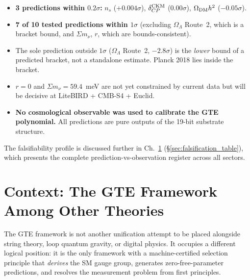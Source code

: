\documentclass[11pt,openany]{book}
\theoremstyle{remark}
\newcommand{\OmL}{\Omega_\Lambda}
\newcommand{\ns}{n_s}
\begin{document}
\begin{tcolorbox}[colback=blue!5,colframe=blue!50!black,
  title={Cosmological Summary: Zero Free Parameters}]
\begin{itemize}
\item \textbf{3 predictions within $0.2\sigma$:}
  $\ns$ ($+0.004\sigma$), $\delta_{CP}^{\rm CKM}$ ($0.00\sigma$),
  $\Omega_{\rm DM}h^2$ ($-0.05\sigma$).
\item \textbf{7 of 10 tested predictions within $1\sigma$}
  (excluding $\OmL$ Route~2, which is a bracket bound, and $\Sigma m_\nu$,
  $r$, which are bounds-consistent).
\item The sole prediction outside $1\sigma$ ($\OmL$ Route~2, $-2.8\sigma$)
  is the \emph{lower} bound of a predicted bracket, not a standalone estimate.
  Planck 2018 lies inside the bracket.
\item $r = 0$ and $\Sigma m_\nu = 59.4$~meV are not yet constrained by current
  data but will be decisive at LiteBIRD + CMB-S4 + Euclid.
\item \textbf{No cosmological observable was used to calibrate the GTE polynomial.}
  All predictions are pure outputs of the 19-bit substrate structure.
\end{itemize}
\end{tcolorbox}

The falsifiability profile is discussed further in Ch.~\ref{chap:context}
(§\ref{sec:falsification_table}), which presents the complete prediction-vs-observation
register across all sectors.

\chapter[Context: GTE Among Other Theories]{Context: The GTE Framework Among Other Theories}
\label{chap:context}

\begin{tcolorbox}[colback=blue!5,colframe=blue!50!black,title={Chapter~11 Claim}]
The GTE framework is not another unification attempt to be placed alongside string theory,
loop quantum gravity, or digital physics. It occupies a different logical position: it is
the only framework with a machine-certified selection principle that \emph{derives} the SM
gauge group, generates zero-free-parameter predictions, and resolves the measurement
problem from first principles.
\end{tcolorbox}
\end{document}
